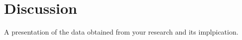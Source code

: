 
	\chapter{Discussion}
	A presentation of the data obtained from your research and its implpication.
